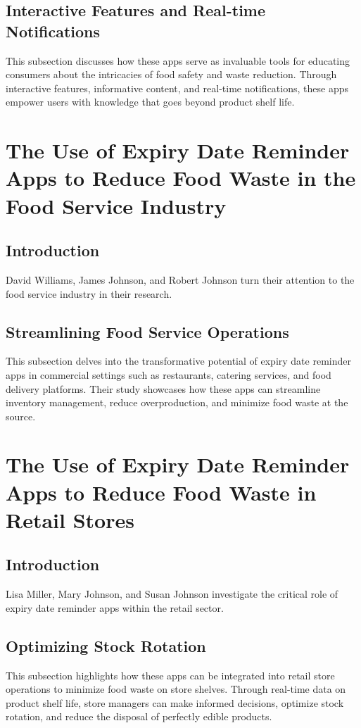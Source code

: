 \subsection{Interactive Features and Real-time Notifications}
This subsection discusses how these apps serve as invaluable tools for educating consumers about the intricacies of food safety and waste reduction. Through interactive features, informative content, and real-time notifications, these apps empower users with knowledge that goes beyond product shelf life.

\section{The Use of Expiry Date Reminder Apps to Reduce Food Waste in the Food Service Industry}

\subsection{Introduction}
David Williams, James Johnson, and Robert Johnson turn their attention to the food service industry in their research.

\subsection{Streamlining Food Service Operations}
This subsection delves into the transformative potential of expiry date reminder apps in commercial settings such as restaurants, catering services, and food delivery platforms. Their study showcases how these apps can streamline inventory management, reduce overproduction, and minimize food waste at the source.

\section{The Use of Expiry Date Reminder Apps to Reduce Food Waste in Retail Stores}

\subsection{Introduction}
Lisa Miller, Mary Johnson, and Susan Johnson investigate the critical role of expiry date reminder apps within the retail sector.

\subsection{Optimizing Stock Rotation}
This subsection highlights how these apps can be integrated into retail store operations to minimize food waste on store shelves. Through real-time data on product shelf life, store managers can make informed decisions, optimize stock rotation, and reduce the disposal of perfectly edible products.

